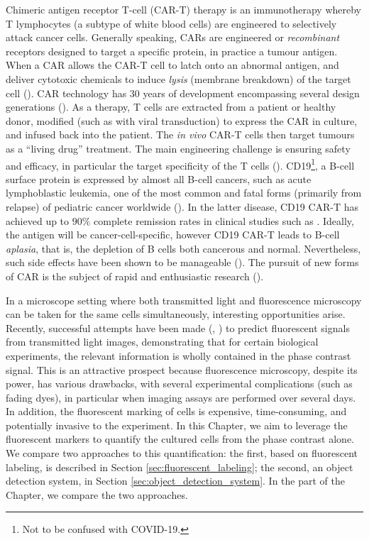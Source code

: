 Chimeric antigen receptor T-cell (CAR-T) therapy is an immunotherapy whereby T lymphocytes (a subtype of white blood cells) are engineered to selectively attack cancer cells. Generally speaking, CARs are engineered or \emph{recombinant} receptors designed to target a specific protein, in practice a tumour antigen. When a CAR allows the CAR-T cell to latch onto an abnormal antigen, and deliver cytotoxic chemicals to induce \emph{lysis}  (membrane breakdown) of the target cell (\cite{benmebarek2019killing}). CAR technology has 30 years of development encompassing several design generations (\cite{maude2015cd19}).  As a therapy, T cells are extracted from a patient or healthy donor, modified (such as with viral transduction) to express the CAR in culture, and infused back into the patient. The \emph{in vivo} CAR-T cells then target tumours as a ``living drug'' treatment. The main engineering challenge is ensuring safety and efficacy, in particular the target specificity of the T cells (\cite{sadelainbasic}). CD19\footnote{Not to be confused with COVID-19.}, a B-cell surface protein is expressed by almost all B-cell cancers, such as acute lymphoblastic leukemia, one of the most common and fatal forms (primarily from relapse) of pediatric cancer worldwide (\cite{hunger2015acute}). In the latter disease, CD19 CAR-T has achieved up to $90\%$ complete remission rates in clinical studies such as \cite{maude2014chimeric}. Ideally, the antigen will be cancer-cell-specific, however CD19 CAR-T leads to B-cell \emph{aplasia}, that is, the depletion of B cells both cancerous and normal. Nevertheless, such side effects have been shown to be manageable (\cite{bonifant2016toxicity}). The pursuit of new forms of CAR is the subject of rapid and enthusiastic research (\cite{wang2017current}).

In a microscope setting where both transmitted light and fluorescence microscopy can be taken for the same cells simultaneously, interesting opportunities arise. Recently, successful attempts have been made (\cite{christiansen2018silico}, \cite{ounkomol2018label}) to predict fluorescent signals from transmitted light images, demonstrating that for certain biological experiments, the relevant information is wholly contained in the phase contrast signal. This is an attractive prospect because fluorescence microscopy, despite its power, has various drawbacks, with several experimental complications (such as fading dyes), in particular when imaging assays are performed over several days. In addition, the fluorescent marking of cells is expensive, time-consuming, and potentially invasive to the experiment. In this Chapter, we aim to leverage the fluorescent markers to quantify the cultured cells from the phase contrast alone. We compare two approaches to this quantification: the first, based on fluorescent labeling, is described in Section \ref{sec:fluorescent_labeling}; the second, an object detection system, in Section \ref{sec:object_detection_system}. In the part of the Chapter, we compare the two approaches.

